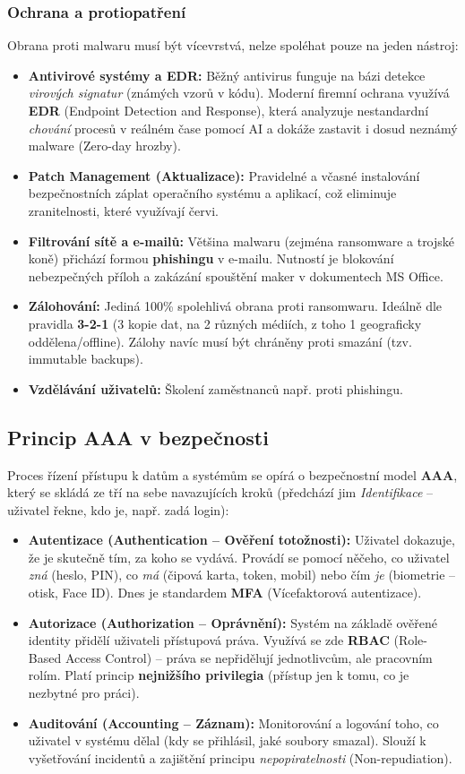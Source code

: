 \subsubsection*{Ochrana a protiopatření}
Obrana proti malwaru musí být vícevrstvá, nelze spoléhat pouze na jeden nástroj:
\begin{itemize}
    \item \textbf{Antivirové systémy a EDR:} Běžný antivirus funguje na bázi detekce \textit{virových signatur} (známých vzorů v kódu). Moderní firemní ochrana využívá \textbf{EDR} (Endpoint Detection and Response), která analyzuje nestandardní \textit{chování} procesů v reálném čase pomocí AI a dokáže zastavit i dosud neznámý malware (Zero-day hrozby).
    \item \textbf{Patch Management (Aktualizace):} Pravidelné a včasné instalování bezpečnostních záplat operačního systému a aplikací, což eliminuje zranitelnosti, které využívají červi.
    \item \textbf{Filtrování sítě a e-mailů:} Většina malwaru (zejména ransomware a trojské koně) přichází formou \textbf{phishingu} v e-mailu. Nutností je blokování nebezpečných příloh a zakázání spouštění maker v dokumentech MS Office.
    \item \textbf{Zálohování:} Jediná 100\% spolehlivá obrana proti ransomwaru. Ideálně dle pravidla \textbf{3-2-1} (3 kopie dat, na 2 různých médiích, z toho 1 geograficky oddělena/offline). Zálohy navíc musí být chráněny proti smazání (tzv. immutable backups).
    \item \textbf{Vzdělávání uživatelů:} Školení zaměstnanců např. proti phishingu.
\end{itemize}

\subsection{Princip AAA v bezpečnosti}
Proces řízení přístupu k datům a systémům se opírá o bezpečnostní model \textbf{AAA}, který se skládá ze tří na sebe navazujících kroků (předchází jim \textit{Identifikace} – uživatel řekne, kdo je, např. zadá login):
\begin{itemize}
    \item \textbf{Autentizace (Authentication – Ověření totožnosti):} Uživatel dokazuje, že je skutečně tím, za koho se vydává. Provádí se pomocí něčeho, co uživatel \textit{zná} (heslo, PIN), co \textit{má} (čipová karta, token, mobil) nebo čím \textit{je} (biometrie – otisk, Face ID). Dnes je standardem \textbf{MFA} (Vícefaktorová autentizace).
    \item \textbf{Autorizace (Authorization – Oprávnění):} Systém na základě ověřené identity přidělí uživateli přístupová práva. Využívá se zde \textbf{RBAC} (Role-Based Access Control) – práva se nepřidělují jednotlivcům, ale pracovním rolím. Platí princip \textbf{nejnižšího privilegia} (přístup jen k tomu, co je nezbytné pro práci).
    \item \textbf{Auditování (Accounting – Záznam):} Monitorování a logování toho, co uživatel v systému dělal (kdy se přihlásil, jaké soubory smazal). Slouží k vyšetřování incidentů a zajištění principu \textit{nepopiratelnosti} (Non-repudiation).
\end{itemize}


